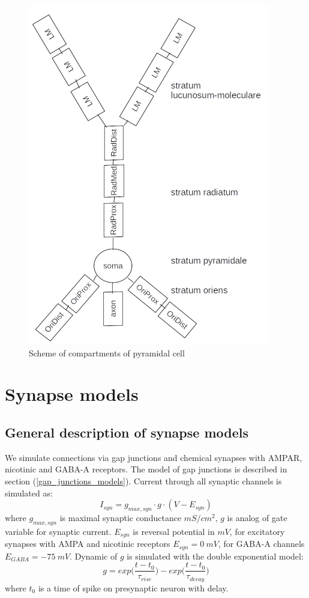 \documentclass[a4paper,12pt]{article}
\begin{document}
\begin{figure}[h]
	\centering
\includegraphics{pyramide_structures.png}
\caption{Scheme of compartments of pyramidal cell}
\label{fig:pyr_structures}
\end{figure}

\section{Synapse models} 
\subsection{General description of synapse models} \label{synapse_models}
We simulate connections via gap junctions and chemical synapses with
AMPAR, nicotinic and GABA-A receptors. The model of gap junctions is described in section (\ref{gap_junctions_models}). Current through all synaptic channels is simulated as:
\begin{equation}
I_{syn} = g_{max, syn} \cdot g \cdot (V - E_{syn})
\end{equation}
where $ g_{max, syn}$ is maximal synaptic conductance $mS/cm^2$, $g$ is analog
of gate variable for synaptic current. $E_{syn}$ is reversal potential in $mV$, for excitatory synapses with AMPA and nicotinic receptors $E_{syn} = 0\ mV$, for GABA-A channels $E_{GABA} = -75\ mV$.
Dynamic of $g$ is simulated with the double exponential model:
\begin{equation}
\label{eq:gsyn}
g = exp \Big( \frac{t - t_0}{\tau_{rise}} \Big) - exp \Big( \frac{t - t_0}{\tau_{decay}} \Big)
\end{equation}
where $t_0$ is a time of spike on presynaptic neuron with delay. 
\end{document}
